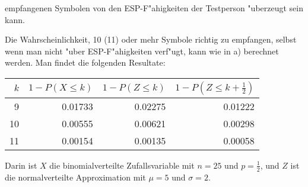 \begin{loesung}
\begin{teilaufgaben}
empfangenen Symbolen von den ESP-F"ahigkeiten der Testperson
"uberzeugt sein kann.
\item
Die Wahrscheinlichkeit, 10 (11) oder mehr Symbole richtig zu empfangen,
selbst wenn man nicht "uber ESP-F"ahigkeiten verf"ugt, kann wie in
a) berechnet werden. Man findet die folgenden Resultate:
\begin{center}
\begin{tabular}{|r|r|r|r|}
\hline
$k$&$1-P(X\le k)$&$1-P(Z\le k)$&$1-P(Z\le k+\frac12)$\\
\hline
 9&0.01733&0.02275&0.01222\\
10&0.00555&0.00621&0.00298\\
11&0.00154&0.00135&0.00058\\
\hline
\end{tabular}
\end{center}
Darin ist $X$ die binomialverteilte Zufallsvariable mit $n=25$ und $p=\frac12$,
und $Z$ ist die normalverteilte Approximation mit $\mu=5$ und $\sigma=2$.
\end{teilaufgaben}
\end{loesung}
